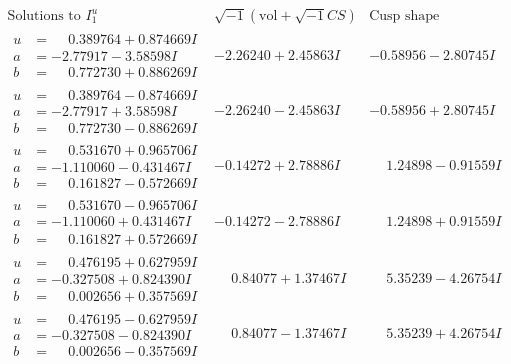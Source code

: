 \documentclass[1p]{elsarticle_modified}
\theoremstyle{definition}
\newcommand{\I}{\sqrt{-1}}
\begin{document}
$$\begin{array}{c|c|c}  
\text{Solutions to }I^u_{1}& \I (\text{vol} + \sqrt{-1}CS) & \text{Cusp shape}\\
 \hline 
\begin{aligned}
u &= \phantom{-}0.389764 + 0.874669 I \\
a &= -2.77917 - 3.58598 I \\
b &= \phantom{-}0.772730 + 0.886269 I\end{aligned}
 & -2.26240 + 2.45863 I & -0.58956 - 2.80745 I \\ \hline\begin{aligned}
u &= \phantom{-}0.389764 - 0.874669 I \\
a &= -2.77917 + 3.58598 I \\
b &= \phantom{-}0.772730 - 0.886269 I\end{aligned}
 & -2.26240 - 2.45863 I & -0.58956 + 2.80745 I \\ \hline\begin{aligned}
u &= \phantom{-}0.531670 + 0.965706 I \\
a &= -1.110060 - 0.431467 I \\
b &= \phantom{-}0.161827 - 0.572669 I\end{aligned}
 & -0.14272 + 2.78886 I & \phantom{-}1.24898 - 0.91559 I \\ \hline\begin{aligned}
u &= \phantom{-}0.531670 - 0.965706 I \\
a &= -1.110060 + 0.431467 I \\
b &= \phantom{-}0.161827 + 0.572669 I\end{aligned}
 & -0.14272 - 2.78886 I & \phantom{-}1.24898 + 0.91559 I \\ \hline\begin{aligned}
u &= \phantom{-}0.476195 + 0.627959 I \\
a &= -0.327508 + 0.824390 I \\
b &= \phantom{-}0.002656 + 0.357569 I\end{aligned}
 & \phantom{-}0.84077 + 1.37467 I & \phantom{-}5.35239 - 4.26754 I \\ \hline\begin{aligned}
u &= \phantom{-}0.476195 - 0.627959 I \\
a &= -0.327508 - 0.824390 I \\
b &= \phantom{-}0.002656 - 0.357569 I\end{aligned}
 & \phantom{-}0.84077 - 1.37467 I & \phantom{-}5.35239 + 4.26754 I \\ \hline\begin{aligned}

\end{aligned}
\end{array}$$
\end{document}
